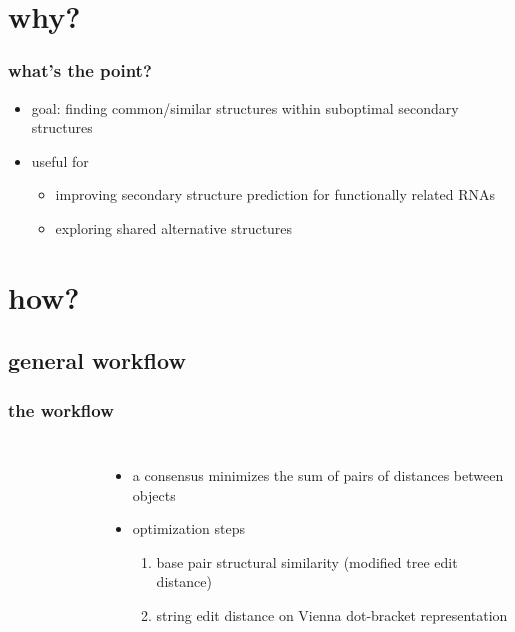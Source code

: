 \documentclass{beamer}
\begin{document}
\section{why?}

\begin{frame}
	\frametitle{what's the point?}
\begin{figure}[!htb]
\centering
\resizebox{0.55\textwidth}{!}{}
\end{figure} 

	\begin{itemize}
		
		\item goal: finding common/similar structures within suboptimal secondary structures
		\item useful for
		\begin{itemize}
			\item improving secondary structure prediction for functionally related RNAs
			\item exploring shared alternative structures
		\end{itemize}
	\end{itemize}
	
\end{frame}


\section{how?}

\subsection{general workflow}
\begin{frame}
	\frametitle{the workflow}
	\begin{columns}
		\centering
		\begin{figure}[!htb]
			\resizebox{1.\textwidth}{!}{}
		\end{figure} 
        
        \begin{itemize}
        		\item a consensus minimizes the sum of pairs of distances between objects
        		\item optimization steps
        		\begin{enumerate}
        		        			\item base pair structural similarity (modified tree edit distance)
        			\item string edit distance on Vienna dot-bracket representation
        		\end{enumerate}

        \end{itemize}
         \end{columns}
         
\end{frame} 
\end{document}
